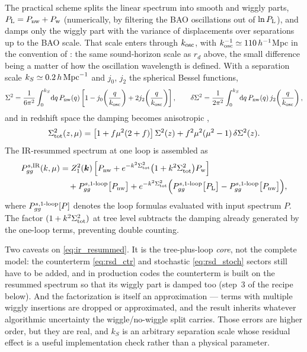\documentclass[a4paper,11pt]{article}
\newcommand{\vk}{\bm{k}}
\def\Plin{P_{\rm L}}
\newcommand{\dd}{\mathrm{d}}
\numberwithin{equation}{section}
\begin{document}
The practical scheme splits the linear spectrum into smooth and wiggly parts, $\Plin = P_{\rm nw} + P_{\rm w}$ (numerically, by filtering the BAO oscillations out of $\ln\Plin$), and damps only the wiggly part with the variance of displacements over separations up to the BAO scale. That scale enters through $k_{\rm osc}$, with $k_{\rm osc}^{-1} \simeq 110\,h^{-1}$Mpc in the convention of \cite{ClassPT2020}: the same sound-horizon scale as $r_d$ above, the small difference being a matter of how the oscillation wavelength is defined. With a separation scale $k_S \simeq 0.2\,h\,{\rm Mpc}^{-1}$ and $j_0$, $j_2$ the spherical Bessel functions,
\begin{equation}
\Sigma^2 = \frac{1}{6\pi^2}\int_0^{k_S}\!\dd q\,P_{\rm nw}(q)
\left[1 - j_0\!\left(\frac{q}{k_{\rm osc}}\right) + 2j_2\!\left(\frac{q}{k_{\rm osc}}\right)\right],
\qquad
\delta\Sigma^2 = \frac{1}{2\pi^2}\int_0^{k_S}\!\dd q\,P_{\rm nw}(q)\,
j_2\!\left(\frac{q}{k_{\rm osc}}\right),
\label{eq:sigma_defs}
\end{equation}
and in redshift space the damping becomes anisotropic \cite[Eqs.~(2.25),~(2.30),~(2.31)]{ClassPT2020},
\begin{equation}
\Sigma^2_{\rm tot}(z,\mu) = \left[1 + f\mu^2(2+f)\right]\Sigma^2(z)
+ f^2\mu^2(\mu^2-1)\,\delta\Sigma^2(z) .
\label{eq:sigma_tot}
\end{equation}
The IR-resummed spectrum at one loop is assembled as
\begin{align}
P_{gg}^{s,\rm IR}(k,\mu)
&= Z_1^2(\vk)\left[P_{\rm nw}
+ e^{-k^2\Sigma^2_{\rm tot}}\big(1+k^2\Sigma^2_{\rm tot}\big)P_{\rm w}\right]
\notag\\
&\quad
+ P_{gg}^{s,\rm 1\text{-}loop}\big[P_{\rm nw}\big]
+ e^{-k^2\Sigma^2_{\rm tot}}
\Big(P_{gg}^{s,\rm 1\text{-}loop}\big[\Plin\big]
- P_{gg}^{s,\rm 1\text{-}loop}\big[P_{\rm nw}\big]\Big) ,
\label{eq:ir_resummed}
\end{align}
where $P^{s,\rm 1\text{-}loop}_{gg}[P]$ denotes the loop formulas evaluated with input spectrum $P$. The factor $(1+k^2\Sigma^2_{\rm tot})$ at tree level subtracts the damping already generated by the one-loop terms, preventing double counting.

Two caveats on \eqref{eq:ir_resummed}. It is the tree-plus-loop \emph{core}, not the complete model: the counterterm \eqref{eq:rsd_ctr} and stochastic \eqref{eq:rsd_stoch} sectors still have to be added, and in production codes the counterterm is built on the resummed spectrum so that its wiggly part is damped too (step~3 of the recipe below). And the factorization is itself an approximation --- terms with multiple wiggly insertions are dropped or approximated, and the result inherits whatever algorithmic uncertainty the wiggle/no-wiggle split carries. Those errors are higher order, but they are real, and $k_S$ is an arbitrary separation scale whose residual effect is a useful implementation check rather than a physical parameter.
\end{document}
